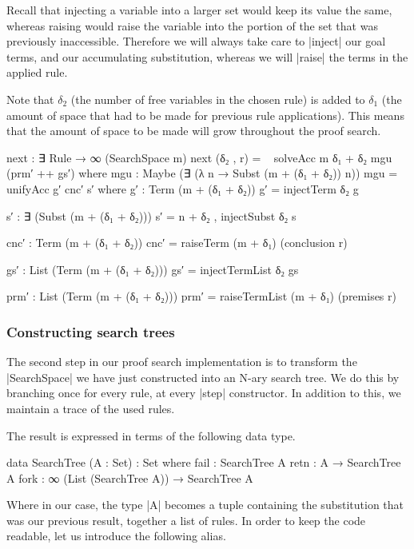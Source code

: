 \documentclass[preprint]{sigplanconf}
\begin{document}
Recall that injecting a variable into a larger set would keep its
value the same, whereas raising would raise the variable into the
portion of the set that was previously inaccessible. Therefore we will
always take care to |inject| our goal terms, and our accumulating
substitution, whereas we will |raise| the terms in the applied
rule.

Note that $\delta_2$ (the number of free variables in the chosen rule)
is added to $\delta_1$ (the amount of space that had to be made for
previous rule applications). This means that the amount of space to be
made will grow throughout the proof search.

\begin{code}
  next : ∃ Rule → ∞ (SearchSpace m)
  next (δ₂ , r) = ~ solveAcc {m} {δ₁ + δ₂} mgu (prm′ ++ gs′)
    where
      mgu   : Maybe (∃ (λ n → Subst (m + (δ₁ + δ₂)) n))
      mgu   = unifyAcc g′ cnc′ s′
        where
          g′    : Term (m + (δ₁ + δ₂))
          g′    = injectTerm δ₂ g

          s′    : ∃ (Subst (m + (δ₁ + δ₂)))
          s′    = n + δ₂ , injectSubst δ₂ s

          cnc′  : Term (m + (δ₁ + δ₂))
          cnc′  = raiseTerm (m + δ₁) (conclusion r)

      gs′   : List (Term (m + (δ₁ + δ₂)))
      gs′   = injectTermList δ₂ gs

      prm′  : List (Term (m + (δ₁ + δ₂)))
      prm′  = raiseTermList (m + δ₁) (premises r)
\end{code}

\subsubsection*{Constructing search trees}

The second step in our proof search implementation is to transform the
|SearchSpace| we have just constructed into an N-ary search tree. We
do this by branching once for every rule, at every |step| constructor.
In addition to this, we maintain a trace of the used rules.

The result is expressed in terms of the following data type.

\begin{code}
data SearchTree (A : Set) : Set where
  fail  : SearchTree A
  retn  : A → SearchTree A
  fork  : ∞ (List (SearchTree A)) → SearchTree A
\end{code}

Where in our case, the type |A| becomes a tuple containing the
substitution that was our previous result, together a list of
rules. In order to keep the code readable, let us introduce the
following alias.
\end{document}
